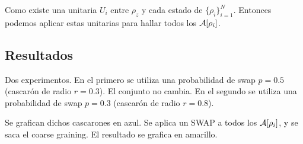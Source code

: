 Como existe una unitaria $U_{i}$ entre $\rho_{z}$ y cada estado de $\{\rho_{i}\}_{i=1}^{N}$. Entonces podemos aplicar estas unitarias para hallar todos los $\mathcal{A}[\rho_{i}]$.

\subsection{Resultados}

Dos experimentos. En el primero se utiliza una probabilidad de swap $p=0.5$ (cascarón de radio $r=0.3$). El conjunto no cambia. En el segundo se utiliza una probabilidad de swap $p=0.3$ (cascarón de radio $r=0.8$).

Se grafican dichos cascarones en azul. Se aplica un SWAP a todos los $\mathcal{A}[\rho_{i}]$, y se saca el coarse graining. El resultado se grafica en amarillo.

